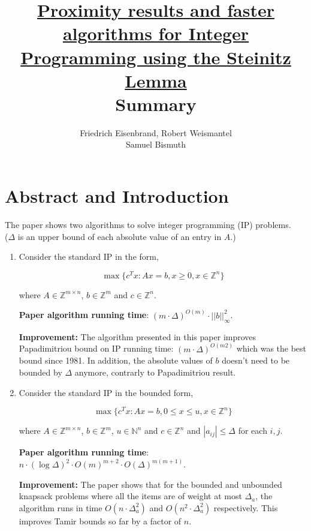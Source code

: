 \documentclass[12pt]{article}
\title{\href{https://arxiv.org/abs/1707.00481}{Proximity results and faster algorithms for Integer Programming using the Steinitz Lemma} \\
Summary}
\author{Friedrich Eisenbrand, Robert Weismantel \\
Samuel Bismuth}
\theoremstyle{definition}
\begin{document}
\maketitle

\section{Abstract and Introduction}

The paper shows two algorithms to solve integer programming (IP) problems. \\


\noindent ($\Delta$ is an upper bound of each absolute value of an entry in $A$.) \\


\begin{enumerate}[label=(\roman*)]
	\item Consider the standard IP in the form,
	
	\begin{equation}\label{eq:IP}
	\max \{c^T x : A x = b, x \geq 0, x \in \mathbb{Z}^n \}
	\end{equation}
	
	where $A \in \mathbb{Z}^{m \times n}$, $b \in \mathbb{Z}^m$ and $c \in \mathbb{Z}^n$. 
	
	\textbf{Paper algorithm running time}: $(m \cdot \Delta)^{O(m)} \cdot ||b||^2_\infty$. 
	
	\textbf{Improvement: } The algorithm presented in this paper improves Papadimitriou bound on IP running time:  $(m \cdot \Delta)^{O(m2)}$ which was the best bound since 1981. In addition, the absolute values of $b$ doesn't need to be bounded by $\Delta$ anymore, contrarly to Papadimitriou result. 
	
	\item Consider the standard IP in the bounded form,
	
	\begin{equation}\label{eq:IP_bounded}
	\max \{c^T x : A x = b, 0 \leq x \leq u , x \in \mathbb{Z}^n \}
	\end{equation}
	
	where $A \in \mathbb{Z}^{m \times n}$, $b \in \mathbb{Z}^m$, $u \in \mathbb{N}^n$ and $c \in \mathbb{Z}^n$ and $|a_{ij}| \leq \Delta$ for each $i, j$. 
	
	\textbf{Paper algorithm running time}: $n \cdot (\log \Delta)^2  \cdot O(m)^{m+2} \cdot O(\Delta)^{m(m+1)}$.
	
	\textbf{Improvement: }The paper shows that for the bounded and unbounded knapsack problems where all the items are of weight at most $\Delta_a$, the algorithm runs in time $O(n \cdot \Delta_a^2)$ and $O(n^2 \cdot \Delta_a^2)$ respectively. This improves Tamir bounds so far by a factor of $n$. 
\end{enumerate}
\end{document}

